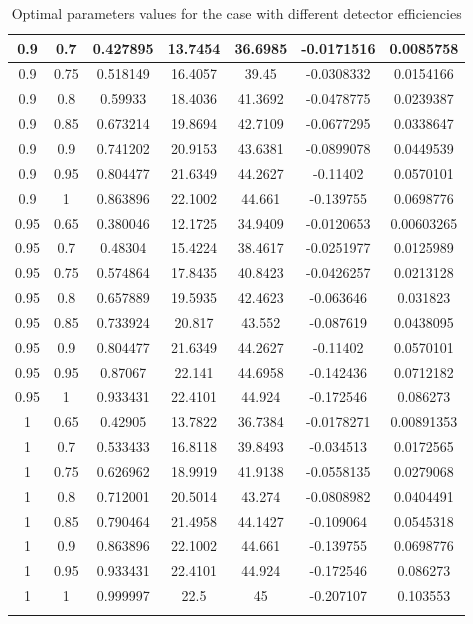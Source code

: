 \documentclass[%
master,         %
subf,           %
href,           %
colorlinks=true %
]{disser}
\numberwithin{equation}{section}
\numberwithin{figure}{section}
\begin{document}
\begin{longtable}{|c|c|c|c|c|c|c|}
0.9 & 0.7 & 0.427895 & 13.7454 & 36.6985 & -0.0171516 & 0.0085758\\\hline
0.9 & 0.75 & 0.518149 & 16.4057 & 39.45 & -0.0308332 & 0.0154166\\\hline
0.9 & 0.8 & 0.59933 & 18.4036 & 41.3692 & -0.0478775 & 0.0239387\\\hline
0.9 & 0.85 & 0.673214 & 19.8694 & 42.7109 & -0.0677295 & 0.0338647\\\hline
0.9 & 0.9 & 0.741202 & 20.9153 & 43.6381 & -0.0899078 & 0.0449539\\\hline
0.9 & 0.95 & 0.804477 & 21.6349 & 44.2627 & -0.11402 & 0.0570101\\\hline
0.9 & 1 & 0.863896 & 22.1002 & 44.661 & -0.139755 & 0.0698776\\\hline
0.95 & 0.65 & 0.380046 & 12.1725 & 34.9409 & -0.0120653 & 0.00603265\\\hline
0.95 & 0.7 & 0.48304 & 15.4224 & 38.4617 & -0.0251977 & 0.0125989\\\hline
0.95 & 0.75 & 0.574864 & 17.8435 & 40.8423 & -0.0426257 & 0.0213128\\\hline
0.95 & 0.8 & 0.657889 & 19.5935 & 42.4623 & -0.063646 & 0.031823\\\hline
0.95 & 0.85 & 0.733924 & 20.817 & 43.552 & -0.087619 & 0.0438095\\\hline
0.95 & 0.9 & 0.804477 & 21.6349 & 44.2627 & -0.11402 & 0.0570101\\\hline
0.95 & 0.95 & 0.87067 & 22.141 & 44.6958 & -0.142436 & 0.0712182\\\hline
0.95 & 1 & 0.933431 & 22.4101 & 44.924 & -0.172546 & 0.086273\\\hline
1 & 0.65 & 0.42905 & 13.7822 & 36.7384 & -0.0178271 & 0.00891353\\\hline
1 & 0.7 & 0.533433 & 16.8118 & 39.8493 & -0.034513 & 0.0172565\\\hline
1 & 0.75 & 0.626962 & 18.9919 & 41.9138 & -0.0558135 & 0.0279068\\\hline
1 & 0.8 & 0.712001 & 20.5014 & 43.274 & -0.0808982 & 0.0404491\\\hline
1 & 0.85 & 0.790464 & 21.4958 & 44.1427 & -0.109064 & 0.0545318\\\hline
1 & 0.9 & 0.863896 & 22.1002 & 44.661 & -0.139755 & 0.0698776\\\hline
1 & 0.95 & 0.933431 & 22.4101 & 44.924 & -0.172546 & 0.086273\\\hline
1 & 1 & 0.999997 & 22.5 & 45 & -0.207107 & 0.103553\\\hline
\caption{Optimal parameters values for the case with different detector efficiencies}
\label{tab:different_etas}
\end{longtable}
\end{document}
